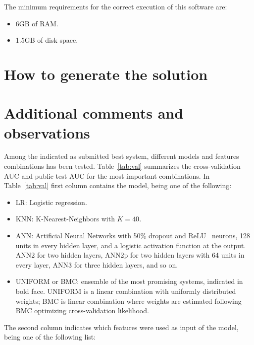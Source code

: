 \documentclass[a4paper,english,twoside]{article}
\begin{document}
The minimum requirements for the correct execution of this software are:

\begin{itemize}
\item
  6GB of RAM.
\item
  1.5GB of disk space.
\end{itemize}

\section{How to generate the
  solution}\label{how-to-generate-the-solution}

\section{Additional comments and
  observations}\label{additional-comments-and-observations}

Among the indicated as submitted best system, different models and
features combinations has been tested. Table~\ref{tab:val} summarizes
the cross-validation AUC and public test AUC for the most important
combinations. In Table~\ref{tab:val} first column contains the model, being one
of the following:

\begin{itemize}
\item
  LR: Logistic regression.
\item
  KNN: K-Nearest-Neighbors with $K=40$.
\item ANN: Artificial Neural Networks with 50\% dropout and
  ReLU~\cite{2011:glorot:aistats} neurons, 128 units in every hidden layer, and
  a logistic activation function at the output.  ANN2 for two hidden layers,
  ANN2p for two hidden layers with 64 units in every layer, ANN3 for three
  hidden layers, and so on.
\item
  UNIFORM or BMC: ensemble of the most promising systems, indicated in
  bold face. UNIFORM is a linear combination with uniformly distributed
  weights; BMC is linear combination where weights are estimated
  following BMC optimizing cross-validation likelihood.
\end{itemize}

The second column indicates which features were used as input of the
model, being one of the following list:
\end{document}
